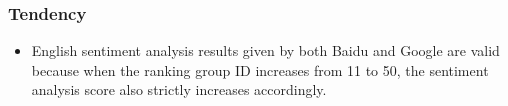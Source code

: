 \subsubsection{Tendency}
\label{sec:org4fa1f32}
\begin{itemize}
\item English sentiment analysis results given by both Baidu and Google are valid because when the ranking group ID increases from 11 to 50, the sentiment analysis score also strictly increases accordingly.
\end{itemize}

